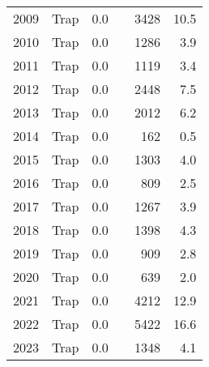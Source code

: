 \begin{longtable}[t]{llrrrr}
2009 & Trap & 0.0 &  & 3428 & 10.5\\
2010 & Trap & 0.0 &  & 1286 & 3.9\\
2011 & Trap & 0.0 &  & 1119 & 3.4\\
2012 & Trap & 0.0 &  & 2448 & 7.5\\
2013 & Trap & 0.0 &  & 2012 & 6.2\\
2014 & Trap & 0.0 &  & 162 & 0.5\\
2015 & Trap & 0.0 &  & 1303 & 4.0\\
2016 & Trap & 0.0 &  & 809 & 2.5\\
2017 & Trap & 0.0 &  & 1267 & 3.9\\
2018 & Trap & 0.0 &  & 1398 & 4.3\\
2019 & Trap & 0.0 &  & 909 & 2.8\\
2020 & Trap & 0.0 &  & 639 & 2.0\\
2021 & Trap & 0.0 &  & 4212 & 12.9\\
2022 & Trap & 0.0 &  & 5422 & 16.6\\
2023 & Trap & 0.0 &  & 1348 & 4.1\\
\bottomrule
\end{longtable}
